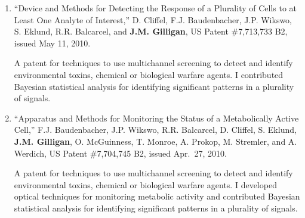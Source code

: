 %
%
\begin{enumerate}
	\item ``Device and Methods for Detecting the Response of a Plurality of Cells to at Least One Analyte of Interest,'' D. Cliffel, F.J. Baudenbacher, J.P. Wikswo, S. Eklund, R.R. Balcarcel, and \textbf{J.M. Gilligan}, US Patent \#7,713,733 B2, issued May 11, 2010.
	\begin{credit}
	A patent for techniques to use multichannel screening to detect and identify environmental toxins, chemical or biological warfare agents. I contributed Bayesian statistical analysis for identifying significant patterns in a plurality of signals.
	\end{credit}
	\item ``Apparatus and Methods for Monitoring the Status of a Metabolically Active Cell,'' F.J. Baudenbacher, J.P. Wikswo, R.R. Balcarcel, D. Cliffel, S. Eklund, \textbf{J.M. Gilligan}, O. McGuinness, T. Monroe, A.
	Prokop, M. Stremler, and A. Werdich, US Patent \#7,704,745 B2, issued Apr.~27, 2010.
	\begin{credit}
	A patent for techniques to use multichannel screening to detect and identify environmental toxins, chemical or biological warfare agents. I developed optical techniques for monitoring metabolic activity and contributed Bayesian statistical analysis for identifying significant patterns in a plurality of signals.
	\end{credit}
\end{enumerate}